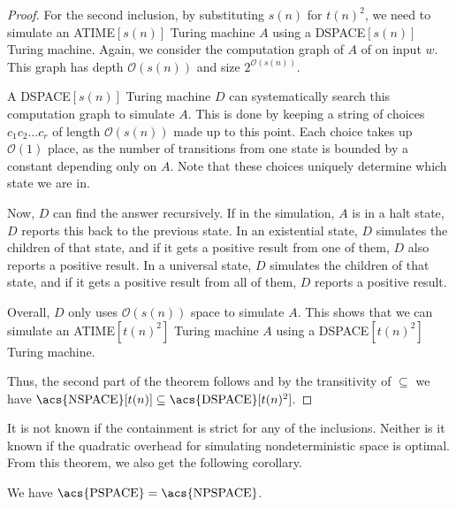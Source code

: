 \begin{proof}
    \vspace{5mm}
    
    \sloppy For the second inclusion, by substituting $s(n)$ for $t(n)^2$, we need to simulate an \acs{ATIME}$[s(n)]$ Turing machine $A$ using a \acs{DSPACE}$[s(n)]$ Turing machine.
    Again, we consider the computation graph of $A$ of on input $w$.
    This graph has depth $\mathcal{O}(s(n))$ and size $2^{\mathcal{O}(s(n))}$.

    A \acs{DSPACE}$[s(n)]$ Turing machine $D$ can systematically search this computation graph to simulate $A$.
    This is done by keeping a string of choices $c_{1}c_{2}\dots c_r$ of length $\mathcal{O}(s(n))$ made up to this point.
    Each choice takes up $\mathcal{O}(1)$ place, as the number of transitions from one state is bounded by a constant depending only on $A$.
    Note that these choices uniquely determine which state we are in.

    Now, $D$ can find the answer recursively.
    If in the simulation, $A$ is in a halt state, $D$ reports this back to the previous state.
    In an existential state, $D$ simulates the children of that state, and if it gets a positive result from one of them, $D$ also reports a positive result.
    In a universal state, $D$ simulates the children of that state, and if it gets a positive result from all of them, $D$ reports a positive result.

    Overall, $D$ only uses $\mathcal{O}(s(n))$ space to simulate $A$.
    This shows that we can simulate an \acs{ATIME}$[t(n)^2]$ Turing machine $A$ using a \acs{DSPACE}$[t(n)^2]$ Turing machine.

    Thus, the second part of the theorem follows and by the transitivity of $\subseteq$ we have $\text{\acs{NSPACE}}[t(n)] \subseteq \text{\acs{DSPACE}}[t(n)^2]$.
\end{proof}

It is not known if the containment is strict for any of the inclusions.
Neither is it known if the quadratic overhead for simulating nondeterministic space is optimal.
From this theorem, we also get the following corollary.

\begin{corollary}
    We have $\text{\upshape \acs{PSPACE}} = \text{\upshape \acs{NPSPACE}}$.
\end{corollary}

